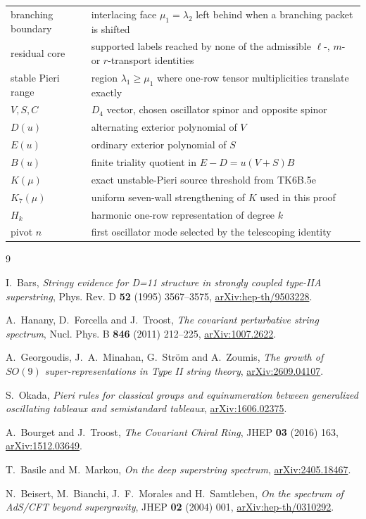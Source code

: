 \documentclass[11pt,a4paper]{article}
\theoremstyle{definition}
\newcommand{\Kseven}{K_{7}}
\begin{document}
\begin{longtable}{p{}p{}}
branching boundary & interlacing face $\mu_1=\lambda_2$ left behind when a branching packet is shifted \\
residual core & supported labels reached by none of the admissible $\ell$-, $m$- or $r$-transport identities \\
stable Pieri range & region $\lambda_1\geq\mu_1$ where one-row tensor multiplicities translate exactly \\
$V,S,C$ & $D_4$ vector, chosen oscillator spinor and opposite spinor \\
$D(u)$ & alternating exterior polynomial of $V$ \\
$E(u)$ & ordinary exterior polynomial of $S$ \\
$B(u)$ & finite triality quotient in $E-D=u(V+S)B$ \\
$K(\mu)$ & exact unstable-Pieri source threshold from TK6B.5e \\
$\Kseven(\mu)$ & uniform seven-wall strengthening of $K$ used in this proof \\
$H_k$ & harmonic one-row representation of degree $k$ \\
pivot $n$ & first oscillator mode selected by the telescoping identity \\
\bottomrule
\end{longtable}

\begin{thebibliography}{9}

I.~Bars,
\emph{Stringy evidence for D=11 structure in strongly coupled type-IIA
superstring},
Phys. Rev. D \textbf{52} (1995) 3567--3575,
\href{https://arxiv.org/abs/hep-th/9503228}{arXiv:hep-th/9503228}.

A.~Hanany, D.~Forcella and J.~Troost,
\emph{The covariant perturbative string spectrum},
Nucl. Phys. B \textbf{846} (2011) 212--225,
\href{https://arxiv.org/abs/1007.2622}{arXiv:1007.2622}.

A.~Georgoudis, J.~A.~Minahan, G.~Str\"om and A.~Zoumis,
\emph{The growth of $SO(9)$ super-representations in Type II string theory},
\href{https://arxiv.org/abs/2609.04107}{arXiv:2609.04107}.

S.~Okada,
\emph{Pieri rules for classical groups and equinumeration between generalized
oscillating tableaux and semistandard tableaux},
\href{https://arxiv.org/abs/1606.02375}{arXiv:1606.02375}.

A.~Bourget and J.~Troost,
\emph{The Covariant Chiral Ring},
JHEP \textbf{03} (2016) 163,
\href{https://arxiv.org/abs/1512.03649}{arXiv:1512.03649}.

T.~Basile and M.~Markou,
\emph{On the deep superstring spectrum},
\href{https://arxiv.org/abs/2405.18467}{arXiv:2405.18467}.

N.~Beisert, M.~Bianchi, J.~F.~Morales and H.~Samtleben,
\emph{On the spectrum of AdS/CFT beyond supergravity},
JHEP \textbf{02} (2004) 001,
\href{https://arxiv.org/abs/hep-th/0310292}{arXiv:hep-th/0310292}.

\end{thebibliography}
\end{document}
